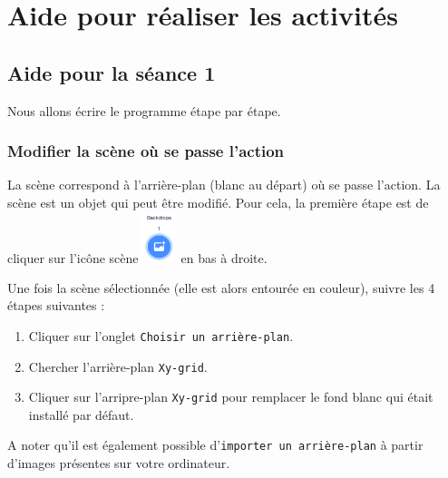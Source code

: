 \newpage





%
%
%
%



\section{Aide pour réaliser les activités}

\subsection{Aide pour la séance 1}\label{correction_scratch1}




Nous allons écrire le programme étape par étape.


\subsubsection{Modifier la scène où se passe l'action}

La scène correspond à l'arrière-plan (blanc au départ) où se passe l'action. La scène est un objet qui peut être modifié. Pour cela, la première étape est de cliquer sur l'icône scène \includegraphics[width=1cm]{./images/scratch/changerScene} en bas à droite.


Une fois la scène sélectionnée (elle est alors entourée en couleur), suivre les 4 étapes suivantes :

\begin{enumerate}
\item Cliquer sur l'onglet \texttt{Choisir un arrière-plan}.
\item Chercher l'arrière-plan \texttt{Xy-grid}.
\item Cliquer sur l'arripre-plan \texttt{Xy-grid} pour remplacer le fond blanc qui était installé par défaut. 
\end{enumerate}

A noter qu'il est également possible d'\texttt{importer un arrière-plan} à partir d'images présentes sur votre ordinateur.

